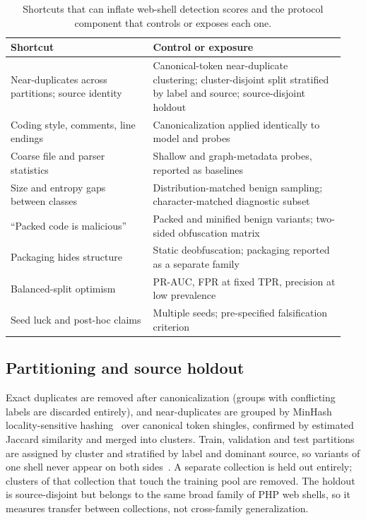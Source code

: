 \documentclass[pdflatex,sn-mathphys-num]{sn-jnl}
\begin{document}
\begin{table}[t]
\centering
\footnotesize
\caption{Shortcuts that can inflate web-shell detection scores and the
protocol component that controls or exposes each one.}
\label{tab:protocol}
\begin{tabular}{@{}p{0.40\linewidth}p{0.54\linewidth}@{}}
\toprule
Shortcut & Control or exposure \\
\midrule
Near-duplicates across partitions; source identity & Canonical-token near-duplicate clustering; cluster-disjoint split stratified by label and source; source-disjoint holdout \\
Coding style, comments, line endings & Canonicalization applied identically to model and probes \\
Coarse file and parser statistics & Shallow and graph-metadata probes, reported as baselines \\
Size and entropy gaps between classes & Distribution-matched benign sampling; character-matched diagnostic subset \\
``Packed code is malicious'' & Packed and minified benign variants; two-sided obfuscation matrix \\
Packaging hides structure & Static deobfuscation; packaging reported as a separate family \\
Balanced-split optimism & PR-AUC, FPR at fixed TPR, precision at low prevalence \\
Seed luck and post-hoc claims & Multiple seeds; pre-specified falsification criterion \\
\bottomrule
\end{tabular}
\end{table}

\subsection{Partitioning and source holdout}\label{sec:p-split}
Exact duplicates are removed after canonicalization (groups with conflicting
labels are discarded entirely), and near-duplicates are grouped by MinHash
locality-sensitive hashing~\cite{broder1997resemblance} over canonical token
shingles, confirmed by estimated Jaccard similarity and merged into clusters.
Train, validation and test partitions are assigned by cluster and stratified
by label and dominant source, so variants of one shell never appear on both
sides~\cite{allamanis2019duplication}. A separate collection is held out
entirely; clusters of that collection that touch the training pool are removed.
The holdout is source-disjoint but belongs to the same broad family of PHP web
shells, so it measures transfer between collections, not cross-family
generalization.
\end{document}
